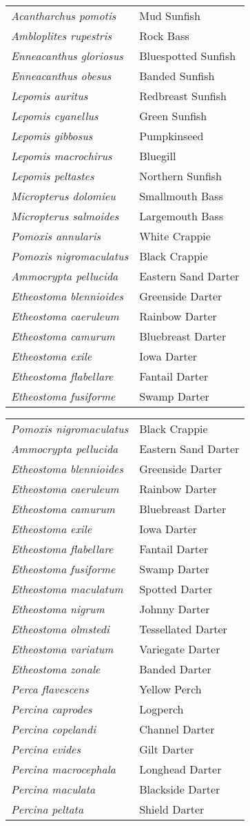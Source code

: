 \documentclass[11pt]{article}
\begin{document}
\vspace{\baselineskip}

%
\textbf{\Student}

\begin{tabular}{@{}L{3in}L{3in}@{}}
\textit{Acantharchus pomotis} & Mud Sunfish\tabularnewline
\textit{Ambloplites rupestris} & Rock Bass\tabularnewline
\textit{Enneacanthus gloriosus} & Bluespotted Sunfish\tabularnewline
\textit{Enneacanthus obesus} & Banded Sunfish\tabularnewline
\textit{Lepomis auritus} & Redbreast Sunfish\tabularnewline
\textit{Lepomis cyanellus} & Green Sunfish\tabularnewline
\textit{Lepomis gibbosus} & Pumpkinseed\tabularnewline
\textit{Lepomis macrochirus} & Bluegill\tabularnewline
\textit{Lepomis peltastes} & Northern Sunfish\tabularnewline
\textit{Micropterus dolomieu} & Smallmouth Bass\tabularnewline
\textit{Micropterus salmoides} & Largemouth Bass\tabularnewline
\textit{Pomoxis annularis} & White Crappie\tabularnewline
\textit{Pomoxis nigromaculatus} & Black Crappie\tabularnewline
\textit{Ammocrypta pellucida} & Eastern Sand Darter\tabularnewline
\textit{Etheostoma blennioides} & Greenside Darter\tabularnewline
\textit{Etheostoma caeruleum} & Rainbow Darter\tabularnewline
\textit{Etheostoma camurum} & Bluebreast Darter\tabularnewline
\textit{Etheostoma exile} & Iowa Darter\tabularnewline
\textit{Etheostoma flabellare} & Fantail Darter\tabularnewline
\textit{Etheostoma fusiforme} & Swamp Darter\tabularnewline
\end{tabular}

\newpage

\vspace{\baselineskip}

%
\textbf{\Student}

\begin{tabular}{@{}L{3in}L{3in}@{}}
\textit{Pomoxis nigromaculatus} & Black Crappie\tabularnewline
\textit{Ammocrypta pellucida} & Eastern Sand Darter\tabularnewline
\textit{Etheostoma blennioides} & Greenside Darter\tabularnewline
\textit{Etheostoma caeruleum} & Rainbow Darter\tabularnewline
\textit{Etheostoma camurum} & Bluebreast Darter\tabularnewline
\textit{Etheostoma exile} & Iowa Darter\tabularnewline
\textit{Etheostoma flabellare} & Fantail Darter\tabularnewline
\textit{Etheostoma fusiforme} & Swamp Darter\tabularnewline
\textit{Etheostoma maculatum} & Spotted Darter\tabularnewline
\textit{Etheostoma nigrum} & Johnny Darter\tabularnewline
\textit{Etheostoma olmstedi} & Tessellated Darter\tabularnewline
\textit{Etheostoma variatum} & Variegate Darter\tabularnewline
\textit{Etheostoma zonale} & Banded Darter\tabularnewline
\textit{Perca flavescens} & Yellow Perch\tabularnewline
\textit{Percina caprodes} & Logperch\tabularnewline
\textit{Percina copelandi} & Channel Darter\tabularnewline
\textit{Percina evides} & Gilt Darter\tabularnewline
\textit{Percina macrocephala} & Longhead Darter\tabularnewline
\textit{Percina maculata} & Blackside Darter\tabularnewline
\textit{Percina peltata} & Shield Darter\tabularnewline
\end{tabular}
\end{document}
